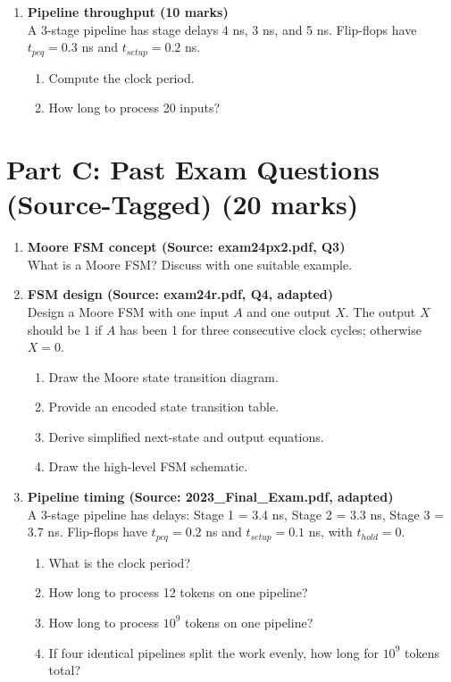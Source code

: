 \documentclass[11pt]{article}
\begin{document}
\begin{enumerate}[label=\textbf{B\arabic*.}]
  \item \textbf{Pipeline throughput (10 marks)}\\
  A 3-stage pipeline has stage delays 4 ns, 3 ns, and 5 ns. Flip-flops have $t_{pcq}=0.3$ ns and $t_{setup}=0.2$ ns.
  \begin{enumerate}[label=(\alph*)]
    \item Compute the clock period.
    \item How long to process 20 inputs?
  \end{enumerate}
\end{enumerate}

\section*{Part C: Past Exam Questions (Source-Tagged) (20 marks)}
\begin{enumerate}[label=\textbf{C\arabic*.}]
  \item \textbf{Moore FSM concept (Source: exam24px2.pdf, Q3)}\\
  What is a Moore FSM? Discuss with one suitable example.

  \item \textbf{FSM design (Source: exam24r.pdf, Q4, adapted)}\\
  Design a Moore FSM with one input $A$ and one output $X$. The output $X$ should be 1 if $A$ has been 1 for three consecutive clock cycles; otherwise $X=0$.
  \begin{enumerate}[label=(\alph*)]
    \item Draw the Moore state transition diagram.
    \item Provide an encoded state transition table.
    \item Derive simplified next-state and output equations.
    \item Draw the high-level FSM schematic.
  \end{enumerate}

  \item \textbf{Pipeline timing (Source: 2023\_Final\_Exam.pdf, adapted)}\\
  A 3-stage pipeline has delays: Stage 1 = 3.4 ns, Stage 2 = 3.3 ns, Stage 3 = 3.7 ns. Flip-flops have $t_{pcq}=0.2$ ns and $t_{setup}=0.1$ ns, with $t_{hold}=0$.
  \begin{enumerate}[label=(\alph*)]
    \item What is the clock period?
    \item How long to process 12 tokens on one pipeline?
    \item How long to process $10^9$ tokens on one pipeline?
    \item If four identical pipelines split the work evenly, how long for $10^9$ tokens total?
  \end{enumerate}
\end{enumerate}
\end{document}
